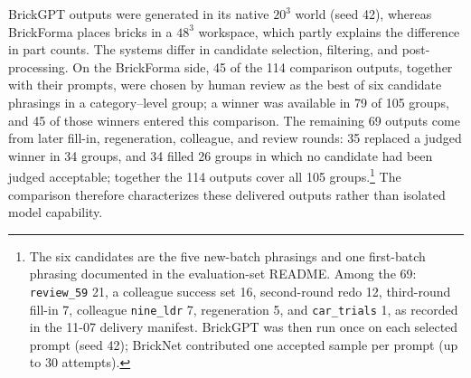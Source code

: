 \documentclass[letterpaper]{article} %
\begin{document}
BrickGPT outputs were generated in its native $20^3$ world (seed 42), whereas BrickForma places bricks in a $48^3$ workspace, which partly explains the difference in part counts.
The systems differ in candidate selection, filtering, and post-processing.
On the BrickForma side, 45 of the 114 comparison outputs, together with their prompts, were chosen by human review as the best of six candidate phrasings in a category--level group; a winner was available in 79 of 105 groups, and 45 of those winners entered this comparison.
The remaining 69 outputs come from later fill-in, regeneration, colleague, and review rounds: 35 replaced a judged winner in 34 groups, and 34 filled 26 groups in which no candidate had been judged acceptable; together the 114 outputs cover all 105 groups.\footnote{The six candidates are the five new-batch phrasings and one first-batch phrasing documented in the evaluation-set README. Among the 69: \texttt{review\_59} 21, a colleague success set 16, second-round redo 12, third-round fill-in 7, colleague \texttt{nine\_ldr} 7, regeneration 5, and \texttt{car\_trials} 1, as recorded in the 11-07 delivery manifest. BrickGPT was then run once on each selected prompt (seed 42); BrickNet contributed one accepted sample per prompt (up to 30 attempts).}
The comparison therefore characterizes these delivered outputs rather than isolated model capability.
\end{document}
